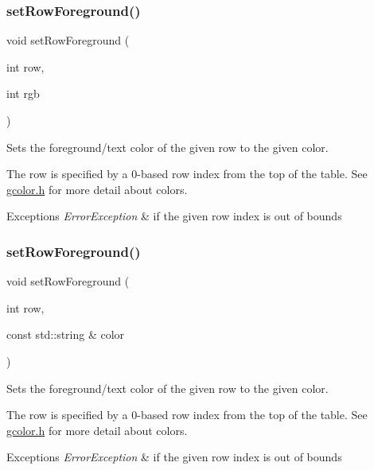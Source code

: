 \subsubsection{\texorpdfstring{set\+Row\+Foreground()}{setRowForeground()}\hspace{0.1cm}{\footnotesize\ttfamily [1/2]}}
{\footnotesize\ttfamily void set\+Row\+Foreground (\begin{DoxyParamCaption}\item[{int}]{row,  }\item[{int}]{rgb }\end{DoxyParamCaption})\hspace{0.3cm}{\ttfamily [virtual]}}



Sets the foreground/text color of the given row to the given color. 

The row is specified by a 0-\/based row index from the top of the table. See \mbox{\hyperlink{gcolor_8h_source}{gcolor.\+h}} for more detail about colors. 
\begin{DoxyExceptions}{Exceptions}
{\em Error\+Exception} & if the given row index is out of bounds \\
\hline
\end{DoxyExceptions}
\mbox{\label{classsgl_1_1GTable_a27ede8127bd8889e3f71dfe152c1684d}} 
\subsubsection{\texorpdfstring{set\+Row\+Foreground()}{setRowForeground()}\hspace{0.1cm}{\footnotesize\ttfamily [2/2]}}
{\footnotesize\ttfamily void set\+Row\+Foreground (\begin{DoxyParamCaption}\item[{int}]{row,  }\item[{const std\+::string \&}]{color }\end{DoxyParamCaption})\hspace{0.3cm}{\ttfamily [virtual]}}



Sets the foreground/text color of the given row to the given color. 

The row is specified by a 0-\/based row index from the top of the table. See \mbox{\hyperlink{gcolor_8h_source}{gcolor.\+h}} for more detail about colors. 
\begin{DoxyExceptions}{Exceptions}
{\em Error\+Exception} & if the given row index is out of bounds \\
\hline
\end{DoxyExceptions}
\mbox{\label{classsgl_1_1GTable_a815f0bed3e7a76d99b4a026808a555b3}} 
